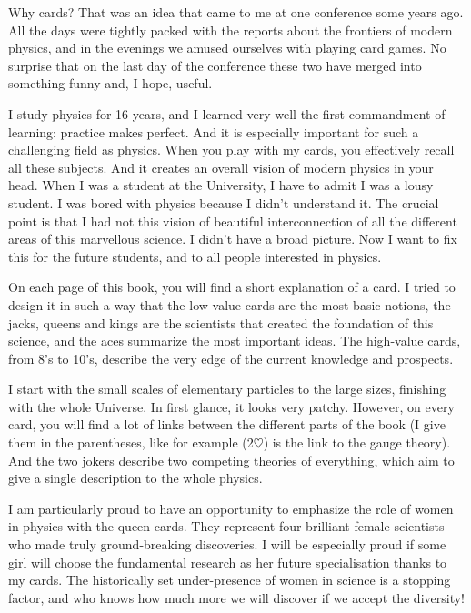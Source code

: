 \documentclass[]{bookest}
\begin{document}
Why cards? That was an idea that came to me at one conference some years ago. All the days were tightly packed with the reports about the frontiers of  modern physics, and in the evenings we amused ourselves with playing card games. No surprise that on the last day of the conference these two have merged into something funny and, I hope, useful.

I study physics for 16 years, and I learned very well the first commandment of learning: practice makes perfect. And it is especially important for such a challenging field as physics. When you play with my cards, you effectively recall all these subjects. And it creates an overall vision of modern physics in your head. When I was a student at the University, I have to admit I was a lousy student. I was bored with physics because I didn't understand it. The crucial point is that I had not this vision of beautiful interconnection of all the different areas of this marvellous science. I didn't have a broad picture. Now I want to fix this for the future students, and to all people interested in physics.

On each page of this book, you will find a short explanation of a card. I tried to design it in such a way that the low-value cards are the most basic notions, the jacks, queens and kings are the scientists that created the foundation of this science, and the aces summarize the most important ideas. The high-value cards, from 8's to 10's, describe the very edge of the current knowledge and prospects.

I start with the small scales of elementary particles to the large sizes, finishing with the whole Universe. In first glance, it looks very patchy. However, on every card, you will find a lot of links between the different parts of the book (I give them in the parentheses, like for example (2$\heartsuit$) is the link to the gauge theory). And the two jokers describe two competing theories of everything, which aim to give a single description to the whole physics.

I am particularly proud to have an opportunity to emphasize the role of women in physics with the queen cards. They represent four brilliant female scientists who made truly ground-breaking discoveries. I will be especially proud if some girl will choose the fundamental research as her future specialisation thanks to my cards. The historically set under-presence of women in science is a stopping factor, and who knows how much more we will discover if we accept the diversity!
\end{document}
